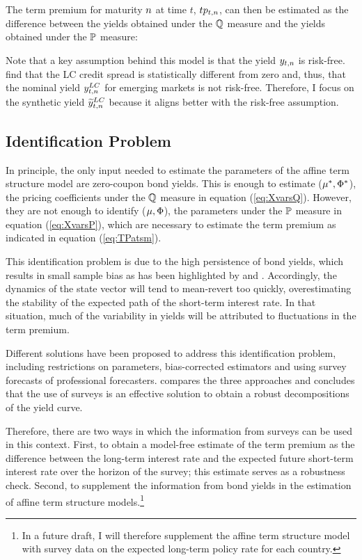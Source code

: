 {The term premium for maturity $n$ at time $t$, $tp_{t,n}$, can then be estimated as the difference between the yields obtained under the $\mathbb{Q}$ measure and the yields obtained under the $\mathbb{P}$ measure:
	

Note that a key assumption behind this model is that the yield $y_{t,n}$ is risk-free. \cite{DuSchreger:2016JoF} find that the LC credit spread is statistically different from zero and, thus, that the nominal yield $y_{t,n} ^{LC}$ for emerging markets is not risk-free. Therefore, I focus on the synthetic yield $\widetilde{y}_{t,n} ^{LC}$ because it aligns better with the risk-free assumption.

\subsection{Identification Problem} \label{sec:Identification}
In principle, the only input needed to estimate the parameters of the affine term structure model are zero-coupon bond yields. This is enough to estimate ($\mu^{*}, \Phi^{*}$), the pricing coefficients under the $\mathbb{Q}$ measure in equation (\ref{eq:XvarsQ}). However, they are not enough to identify ($\mu, \Phi$), the parameters under the $\mathbb{P}$ measure in equation (\ref{eq:XvarsP}), which are necessary to estimate the term premium as indicated in equation (\ref{eq:TPatsm}).

This identification problem is due to the high persistence of bond yields, which results in small sample bias as has been highlighted by \cite{KimOrphanides:2012} and \cite{Guimaraes:2014}. Accordingly, the dynamics of the state vector will tend to mean-revert too quickly, overestimating the stability of the expected path of the short-term interest rate. In that situation, much of the variability in yields will be attributed to fluctuations in the term premium.

Different solutions have been proposed to address this identification problem, including restrictions on parameters, bias-corrected estimators and using survey forecasts of professional forecasters. \cite{Guimaraes:2014} compares the three approaches and concludes that the use of surveys is an effective solution to obtain a robust decompositions of the yield curve.

Therefore, there are two ways in which the information from surveys can be used in this context. First, to obtain a model-free estimate of the term premium as the difference between the long-term interest rate and the expected future short-term interest rate over the horizon of the survey; this estimate serves as a robustness check. Second, to supplement the information from bond yields in the estimation of affine term structure models.\footnote{In a future draft, I will therefore supplement the affine term structure model with survey data on the expected long-term policy rate for each country.}


}
